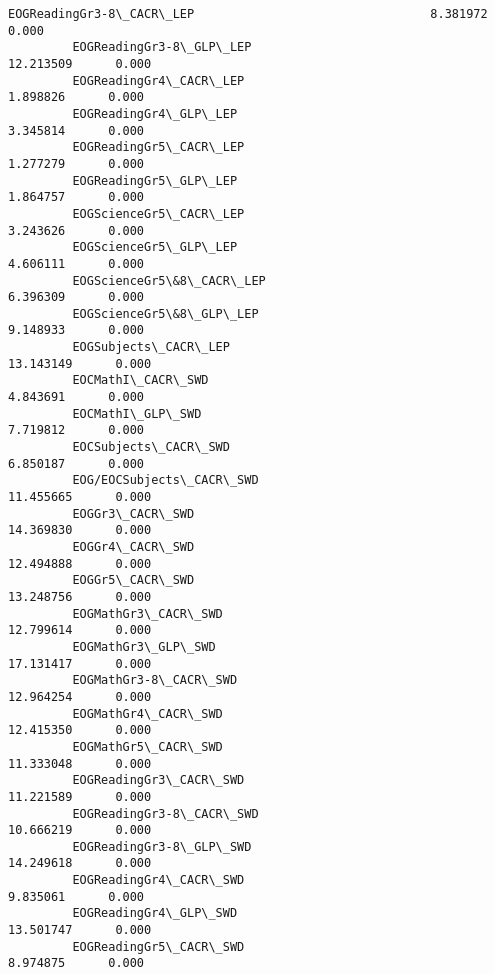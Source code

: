 \documentclass[11pt]{article}
\begin{document}
\begin{Verbatim}[commandchars=\\\{\}]
         EOGReadingGr3-8\_CACR\_LEP                                 8.381972      0.000   
         EOGReadingGr3-8\_GLP\_LEP                                 12.213509      0.000   
         EOGReadingGr4\_CACR\_LEP                                   1.898826      0.000   
         EOGReadingGr4\_GLP\_LEP                                    3.345814      0.000   
         EOGReadingGr5\_CACR\_LEP                                   1.277279      0.000   
         EOGReadingGr5\_GLP\_LEP                                    1.864757      0.000   
         EOGScienceGr5\_CACR\_LEP                                   3.243626      0.000   
         EOGScienceGr5\_GLP\_LEP                                    4.606111      0.000   
         EOGScienceGr5\&8\_CACR\_LEP                                 6.396309      0.000   
         EOGScienceGr5\&8\_GLP\_LEP                                  9.148933      0.000   
         EOGSubjects\_CACR\_LEP                                    13.143149      0.000   
         EOCMathI\_CACR\_SWD                                        4.843691      0.000   
         EOCMathI\_GLP\_SWD                                         7.719812      0.000   
         EOCSubjects\_CACR\_SWD                                     6.850187      0.000   
         EOG/EOCSubjects\_CACR\_SWD                                11.455665      0.000   
         EOGGr3\_CACR\_SWD                                         14.369830      0.000   
         EOGGr4\_CACR\_SWD                                         12.494888      0.000   
         EOGGr5\_CACR\_SWD                                         13.248756      0.000   
         EOGMathGr3\_CACR\_SWD                                     12.799614      0.000   
         EOGMathGr3\_GLP\_SWD                                      17.131417      0.000   
         EOGMathGr3-8\_CACR\_SWD                                   12.964254      0.000   
         EOGMathGr4\_CACR\_SWD                                     12.415350      0.000   
         EOGMathGr5\_CACR\_SWD                                     11.333048      0.000   
         EOGReadingGr3\_CACR\_SWD                                  11.221589      0.000   
         EOGReadingGr3-8\_CACR\_SWD                                10.666219      0.000   
         EOGReadingGr3-8\_GLP\_SWD                                 14.249618      0.000   
         EOGReadingGr4\_CACR\_SWD                                   9.835061      0.000   
         EOGReadingGr4\_GLP\_SWD                                   13.501747      0.000   
         EOGReadingGr5\_CACR\_SWD                                   8.974875      0.000   

\end{Verbatim}
\end{document}
